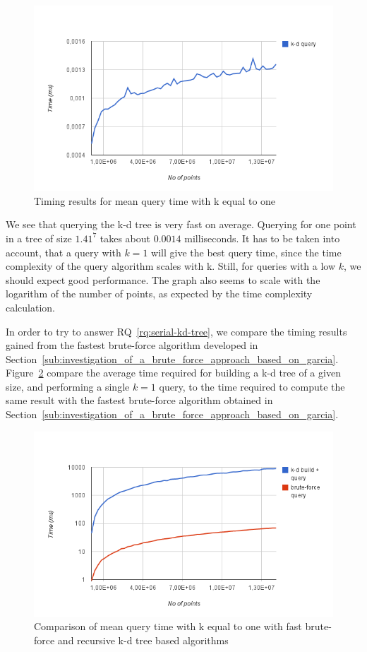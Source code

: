 \begin{figure}[ht!]
    \centering
    \includegraphics[width=120mm]{../gfx/serial-query.png}
    \caption{Timing results for mean query time with k equal to one}
    \label{fig:serial-query}
\end{figure}

We see that querying the k-d tree is very fast on average. Querying for one point in a tree of size $1.41^7$ takes about $0.0014$ milliseconds. It has to be taken into account, that a query with $k=1$ will give the best query time, since the time complexity of the query algorithm scales with k. Still, for queries with a low $k$, we should expect good performance. The graph also seems to scale with the logarithm of the number of points, as expected by the time complexity calculation.

In order to try to answer RQ~\ref{rq:serial-kd-tree}, we compare the timing results gained from the fastest brute-force algorithm developed in Section~\ref{sub:investigation_of_a_brute_force_approach_based_on_garcia}. Figure~\ref{fig:brute-force-vs-serial-build-query} compare the average time required for building a k-d tree of a given size, and performing a single $k=1$ query, to the time required to compute the same result with the fastest brute-force algorithm obtained in Section~\ref{sub:investigation_of_a_brute_force_approach_based_on_garcia}.

\begin{figure}[ht!]
\centering
\includegraphics[width=120mm]{../gfx/brute-force-vs-serial-build-query.png}
\caption{Comparison of mean query time with k equal to one with fast brute-force and recursive k-d tree based algorithms}
\label{fig:brute-force-vs-serial-build-query}
\end{figure}

